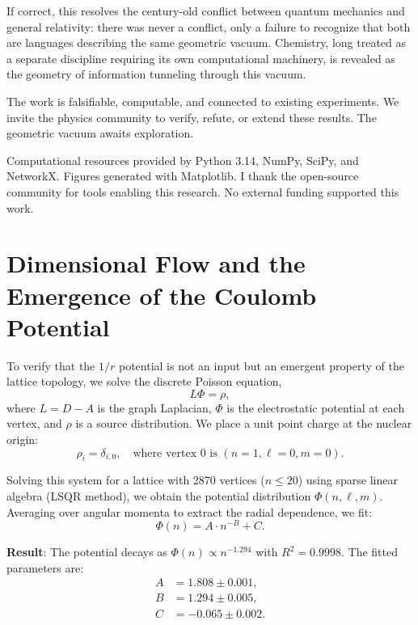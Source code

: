\documentclass[aps,prd,twocolumn,superscriptaddress,groupedaddress,showpacs]{revtex4-2}
\begin{document}
If correct, this resolves the century-old conflict between quantum mechanics and general relativity: there was never a conflict, only a failure to recognize that both are languages describing the same geometric vacuum. Chemistry, long treated as a separate discipline requiring its own computational machinery, is revealed as the geometry of information tunneling through this vacuum.

The work is falsifiable, computable, and connected to existing experiments. We invite the physics community to verify, refute, or extend these results. The geometric vacuum awaits exploration.

\begin{acknowledgments}
Computational resources provided by Python 3.14, NumPy, SciPy, and NetworkX. Figures generated with Matplotlib. I thank the open-source community for tools enabling this research. No external funding supported this work.
\end{acknowledgments}

\appendix

\section{Dimensional Flow and the Emergence of the Coulomb Potential}
\label{app:greens}

To verify that the $1/r$ potential is not an input but an emergent property of the lattice topology, we solve the discrete Poisson equation,
\begin{equation}
L \Phi = \rho,
\end{equation}
where $L = D - A$ is the graph Laplacian, $\Phi$ is the electrostatic potential at each vertex, and $\rho$ is a source distribution. We place a unit point charge at the nuclear origin:
\begin{equation}
\rho_i = \delta_{i,0}, \quad \text{where vertex 0 is } (n=1, \ell=0, m=0).
\end{equation}

Solving this system for a lattice with 2870 vertices ($n \leq 20$) using sparse linear algebra (LSQR method), we obtain the potential distribution $\Phi(n, \ell, m)$. Averaging over angular momenta to extract the radial dependence, we fit:
\begin{equation}
\Phi(n) = A \cdot n^{-B} + C.
\end{equation}

\textbf{Result}: The potential decays as $\Phi(n) \propto n^{-1.294}$ with $R^2 = 0.9998$. The fitted parameters are:
\begin{align}
A &= 1.808 \pm 0.001, \\
B &= 1.294 \pm 0.005, \\
C &= -0.065 \pm 0.002.
\end{align}
\end{document}
